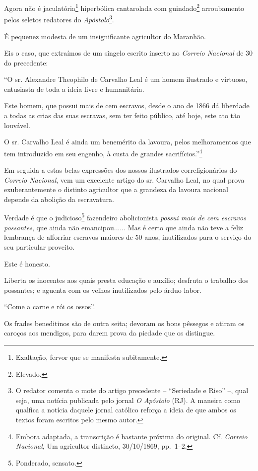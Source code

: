 \asterisc{}

Agora não é jaculatória\footnote{ Exaltação, fervor que se manifesta
  subitamente.} hiperbólica cantarolada com guindado\footnote{ Elevado.}
arroubamento pelos seletos redatores do \emph{Apóstolo}\footnote{ O
  redator comenta o mote do artigo precedente -- ``Seriedade e Riso'' --,
  qual seja, uma notícia publicada pelo jornal \emph{O Apóstolo} (RJ). A
  maneira como qualfica a notícia daquele jornal católico reforça a
  ideia de que ambos os textos foram escritos pelo mesmo autor.}.

É pequenez modesta de um insignificante agricultor do Maranhão.

Eis o caso, que extraímos de um singelo escrito inserto no \emph{Correio
Nacional} de 30 do precedente:

``O sr. Alexandre Theophilo de Carvalho Leal é um homem ilustrado e
virtuoso, entusiasta de toda a ideia livre e humanitária.

Este homem, que possui mais de cem escravos, desde o ano de 1866 dá
liberdade a todas as crias das suas escravas, sem ter feito público, até
hoje, este ato tão louvável.

O sr. Carvalho Leal é ainda um benemérito da lavoura, pelos
melhoramentos que tem introduzido em seu engenho, à custa de grandes
sacrifícios.''\footnote{ Embora adaptada, a transcrição é bastante
  próxima do original. Cf. \emph{Correio Nacional}, Um agricultor
  distincto, 30/10/1869, pp.~1--2.}

Em seguida a estas belas expressões dos nossos ilustrados
correligionários do \emph{Correio Nacional}, vem um excelente artigo do
sr. Carvalho Leal, no qual prova exuberantemente o distinto agricultor
que a grandeza da lavoura nacional depende da abolição da escravatura.

Verdade é que o judicioso\footnote{ Ponderado, sensato.} fazendeiro
abolicionista \emph{possui mais de cem escravos possantes}, que ainda
não emancipou...... Mas é certo que ainda não teve a feliz lembrança de
alforriar escravos maiores de 50 anos, inutilizados para o serviço do
seu particular proveito.

Este é honesto.

Liberta os inocentes aos quais presta educação e auxílio; desfruta o
trabalho dos possantes; e aguenta com os velhos inutilizados pelo árduo
labor.

``Come a carne e rói os ossos''.

Os frades beneditinos são de outra seita; devoram os bons pêssegos e
atiram os caroços aos mendigos, para darem prova da piedade que os
distingue.

